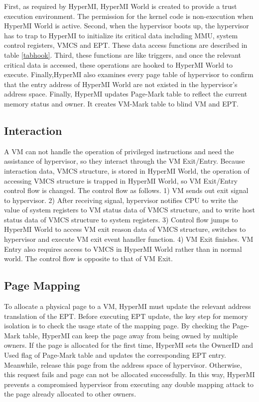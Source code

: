 \documentclass[conference]{IEEEtran}
\begin{document}
First, as required by HyperMI, HyperMI World is created to provide a trust execution environment. The permission for the kernel code is non-execution when HyperMI World is active. 
Second, when the hypervisor boots up, the hypervisor has to trap to HyperMI to initialize its critical data including MMU, system control registers, VMCS and EPT. These data access functions are described in table \ref{tabhook}.
Third, these functions are like triggers, and once the relevant critical data is accessed, these operations are hooked to HyperMI World to execute. 
Finally,HyperMI also examines every page table of hypervisor to confirm that the entry address of HyperMI World are not existed in the hypervisor's address space. 
Finally, HyperMI updates Page-Mark table to reflect the current memory status and owner. It creates VM-Mark table to blind VM and EPT.


\subsection {Interaction}

A VM can not handle the operation of privileged instructions and need the assistance of hypervisor, so they interact through the VM Exit/Entry. Because interaction data, VMCS structure, is stored in HyperMI World, the operation of accessing VMCS structure is trapped in HyperMI World, so VM Exit/Entry control flow is changed. The control flow as follows. 1) VM sends out exit signal to hypervisor. 2) After receiving signal, hypervisor notifies CPU to write the value of system registers to VM status data of VMCS structure, and to write host status data of VMCS structure to system registers. 3) Control flow jumps to HyperMI World to access VM exit reason data of VMCS structure, switches to hypervisor and execute VM exit event handler function. 4) VM Exit finishes.
VM Entry also requires access to VMCS in HyperMI World rather than in normal world. The control flow is opposite to that of VM Exit.

\subsection {Page Mapping}

To allocate a physical page to a VM, HyperMI must update the relevant address translation of the EPT.
Before executing EPT update, the key step for memory isolation is to check the usage state of the mapping page. 
By checking the Page-Mark table, HyperMI can keep the page away from being owned by multiple owners. If the page is allocated for the first time, HyperMI sets the OwnerID and Used flag of Page-Mark table and updates the corresponding EPT entry. Meanwhile, release this page from the address space of hypervisor. Otherwise, this request fails and page can not be allocated successfully. In this way, HyperMI prevents a compromised hypervisor from executing any double mapping attack to the page already allocated to other owners.
\end{document}
